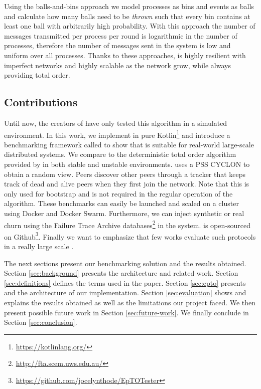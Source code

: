 \par
Using the balls-and-bins approach we model processes as bins and events as balls and calculate how many balls need to be \textit{thrown} such that every bin contains at least one ball with arbitrarily high probability. With this approach the number of messages transmitted per process per round is logarithmic in the number of processes, therefore the number of messages sent in the system is low and uniform over all processes. Thanks to these approaches, \epto is highly resilient with  imperfect networks and highly scalable as the network grow, while always providing total order.
\subsection{Contributions}
Until now, the creators of \epto have only tested this algorithm in a simulated environment. In this work, we implement \epto in pure Kotlin\footnote{\href{https://kotlinlang.org/}{https://kotlinlang.org/}} and introduce a benchmarking framework called \eptotester{} to show that \epto is suitable for real-world large-scale distributed systems. We compare \epto to the deterministic total order algorithm provided by \jgroups \autocite{jgroups} in both stable and unstable environments. \epto uses a PSS CYCLON \autocite{Voulgaris2005} to obtain a random view. 
Peers discover other peers through a tracker that keeps track of dead and alive peers when they first join the network.
Note that this is only used for bootstrap and is not required in the regular operation of the algorithm.
These benchmarks can easily be launched and scaled on a cluster using Docker and Docker Swarm. Furthermore, we can inject synthetic or real churn using the Failure Trace Archive databases\footnote{\href{http://fta.scem.uws.edu.au/}{http://fta.scem.uws.edu.au/}} in the system. \eptotester is open-sourced on Github\footnote{\href{https://github.com/jocelynthode/EpTOTester}{https://github.com/jocelynthode/EpTOTester}}. Finally we want to emphasize that few works evaluate such protocols in a really large scale \autocites[]{Chandra2007}[]{Maia2011}.
\par
The next sections present our benchmarking solution and the results obtained. Section \ref{sec:background} presents the \epto architecture and related work. Section \ref{sec:definitions} defines the terms used in the paper. Section \ref{sec:epto} presents \eptotester and the architecture of our implementation. Section \ref{sec:evaluation} shows and explains the results obtained as well as the limitations our project faced. We then present possible future work in Section \ref{sec:future-work}. We finally conclude in Section \ref{sec:conclusion}.
